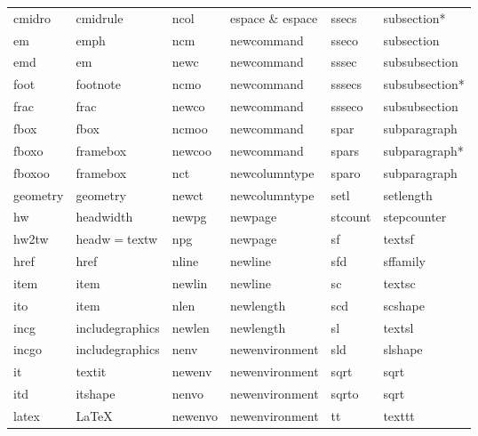 \documentclass[11pt]{article}
\begin{document}
\begin{table}[!h]
{\begin{tabular}{llllll}
cmidro           & cmidrule          & ncol       & espace \& espace & ssecs           & subsection* \\
em               & emph              & ncm        & newcommand     & sseco           & subsection \\ 
emd              & em                & newc       & newcommand     & sssec           & subsubsection \\
foot             & footnote          & ncmo       & newcommand     & sssecs          & subsubsection* \\
frac             & frac              & newco      & newcommand     & ssseco          & subsubsection \\
fbox             & fbox              & ncmoo      & newcommand     & spar            & subparagraph \\
fboxo            & framebox          & newcoo     & newcommand     & spars           & subparagraph* \\
fboxoo           & framebox          & nct        & newcolumntype  & sparo           & subparagraph \\
geometry         & geometry          & newct      & newcolumntype  & setl            & setlength \\
hw               & headwidth         & newpg      & newpage        & stcount         & stepcounter \\
hw2tw            & headw\(=\)textw   & npg        & newpage        & sf              & textsf \\
href             & href              & nline      & newline        & sfd             & sffamily \\
item             & item              & newlin     & newline        & sc              & textsc \\
ito              & item              & nlen       & newlength      & scd             & scshape \\
incg             & includegraphics   & newlen     & newlength      & sl              & textsl \\
incgo            & includegraphics   & nenv       & newenvironment & sld             & slshape \\
it               & textit            & newenv     & newenvironment & sqrt            & sqrt \\
itd              & itshape           & nenvo      & newenvironment & sqrto           & sqrt \\
latex            & LaTeX             & newenvo    & newenvironment & tt              & texttt \\

\end{tabular}}
\end{table}
\end{document}
